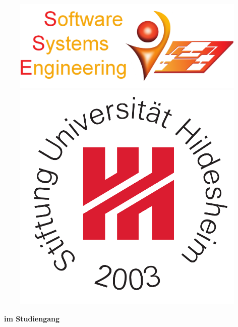 \begin{titlepage}
\begin{figure}
    \includegraphics[scale=0.22]{Bilder/SSE_logo_2000_resized.pdf}
		\hfill
		\includegraphics[scale=0.25]{Bilder/St_Uni-Logo-9-2003-eps-converted-to.pdf}
\end{figure}
\begin{center}
    \vspace*{0cm}
    \huge{\textbf{\art~im Studiengang \studiengang}}
\end{center}
\begin{center}
    \vspace{1cm}

\end{center}
\end{titlepage}
